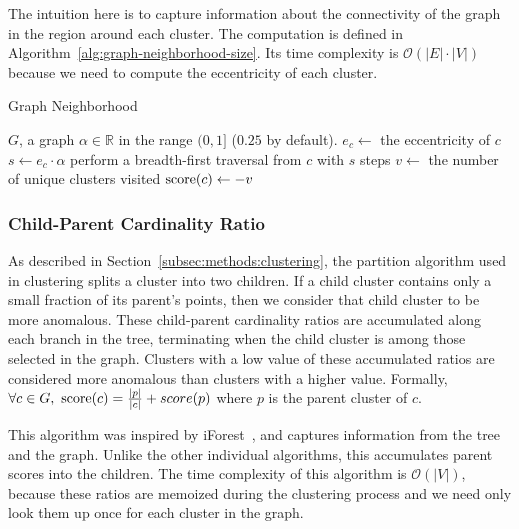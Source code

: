 The intuition here is to capture information about the connectivity of the graph in the region around each cluster.
The computation is defined in Algorithm~\ref{alg:graph-neighborhood-size}.
Its time complexity is $\mathcal{O}(|E| \cdot |V|)$ because we need to compute the eccentricity of each cluster.

\begin{algorithm}[h]
    \caption{Graph Neighborhood}
    \label{alg:graph-neighborhood-size}
\begin{algorithmic}[1]
    \REQUIRE $G$, a graph
    \REQUIRE $\alpha \in \mathbb{R}$ in the range $(0,1]$ ($0.25$ by default).
        \STATE $e_c \gets$ the eccentricity of $c$
        \STATE $s \gets e_c \cdot \alpha$  %
        \STATE perform a breadth-first traversal from $c$ with $s$ steps
        \STATE $v \gets$ the number of unique clusters visited
        \STATE $\operatorname{score}(c) \gets -v$
    \ENDFOR
\end{algorithmic}
\end{algorithm}


\subsubsection{Child-Parent Cardinality Ratio}
\label{subsubsec:methods:individual-algorithms:child-parent-cardinality-ratio}
As described in Section~\ref{subsec:methods:clustering}, the partition algorithm used in clustering splits a cluster into two children.
If a child cluster contains only a small fraction of its parent's points, then we consider that child cluster to be more anomalous.
These child-parent cardinality ratios are accumulated along each branch in the tree, terminating when the child cluster is among those selected in the graph.
Clusters with a low value of these accumulated ratios are considered more anomalous than clusters with a higher value.
Formally, $\forall c \in G, \ \score(c) = \frac{|p|}{|c|} + score(p)$ where $p$ is the parent cluster of $c$.

This algorithm was inspired by iForest~\cite{tony2008iforest}, and captures information from the tree and the graph.
Unlike the other individual algorithms, this accumulates parent scores into the children.
The time complexity of this algorithm is $\mathcal{O}(|V|)$, because these ratios are memoized during the clustering process and we need only look them up once for each cluster in the graph.


